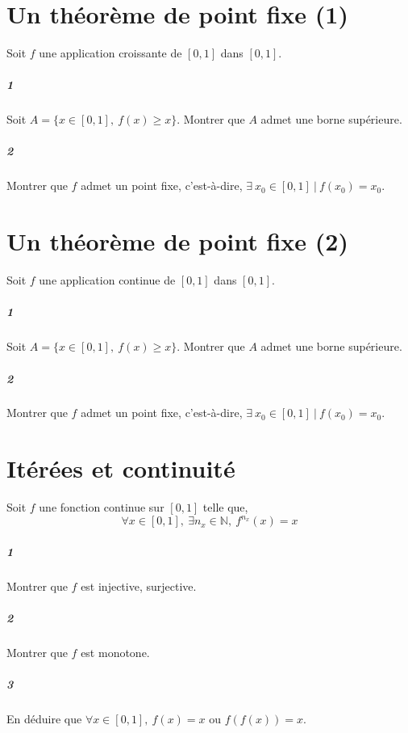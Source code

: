 \documentclass[10pt,a4paper]{article}
\begin{document}
\section{Un théorème de point fixe (1)}
Soit $f$ une application croissante de $[0,1]$ dans $[0,1]$.
\subparagraph{1}Soit $A=\{ x \in [0,1], \ f(x) \geq x \}$. Montrer que $A$ admet une borne supérieure.
\subparagraph{2}Montrer que $f$ admet un point fixe, c'est-à-dire, $\exists \ x_0 \in [0,1] \ | \ f(x_0)=x_0$.

\section{Un théorème de point fixe (2)}
Soit $f$ une application continue de $[0,1]$ dans $[0,1]$.
\subparagraph{1}Soit $A=\{ x \in [0,1], \ f(x) \geq x \}$. Montrer que $A$ admet une borne supérieure.
\subparagraph{2}Montrer que $f$ admet un point fixe, c'est-à-dire, $\exists \ x_0 \in [0,1] \ | \ f(x_0)=x_0$.

\section{Itérées et continuité}
Soit $f$ une fonction continue sur $[0,1]$ telle que,
\begin{equation}
\forall x \in [0,1], \ \exists n_x \in \mathbb{N}, \ f^{n_x}(x) = x
\end{equation}
\subparagraph{1}Montrer que $f$ est injective, surjective.
\subparagraph{2}Montrer que $f$ est monotone.
\subparagraph{3}En déduire que $\forall x \in [0,1], \ f(x) = x$ ou $f(f(x)) = x$.
\end{document}
